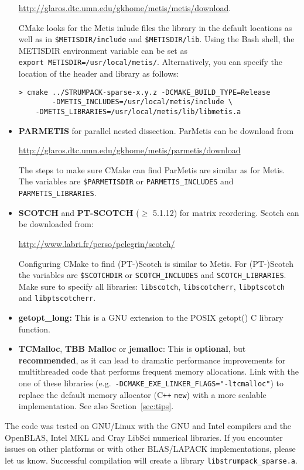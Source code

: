 \documentclass{article}
\newcommand{\tm}{\textsuperscript{\textregistered}}
\begin{document}
\begin{itemize}
  \url{http://glaros.dtc.umn.edu/gkhome/metis/metis/download}.

  CMake looks for the Metis inlude files the library in the default
  locations as well as in
  \lstinline[style=Bash]!$METISDIR/include!  and
  \lstinline[style=Bash]!$METISDIR/lib!. Using the Bash shell, the
  METISDIR environment variable can be set as\\
  \lstinline[style=Bash]!export METISDIR=/usr/local/metis/!.
  Alternatively, you can specify the
  location of the header and library as follows:
  \begin{lstlisting}[style=Bash]
    > cmake ../STRUMPACK-sparse-x.y.z -DCMAKE_BUILD_TYPE=Release
        -DMETIS_INCLUDES=/usr/local/metis/include \
	-DMETIS_LIBRARIES=/usr/local/metis/lib/libmetis.a
  \end{lstlisting}

\item \textbf{PARMETIS} for parallel nested dissection. ParMetis can
  be download from

  \url{http://glaros.dtc.umn.edu/gkhome/metis/parmetis/download}

  The steps to make sure CMake can find ParMetis are similar as for
  Metis. The variables are
  \lstinline[style=Bash]!$PARMETISDIR! or
  \lstinline[style=Bash]!PARMETIS_INCLUDES! and
  \lstinline[style=Bash]!PARMETIS_LIBRARIES!.

\item \textbf{SCOTCH} and \textbf{PT-SCOTCH} ($\geq$ 5.1.12) for
  matrix reordering. Scotch can be downloaded from:

  \url{http://www.labri.fr/perso/pelegrin/scotch/}

  Configuring CMake to find (PT-)Scotch is similar to Metis. For
  (PT-)Scotch the variables are
  \lstinline[style=Bash]!$SCOTCHDIR! or
  \lstinline[style=Bash]!SCOTCH_INCLUDES! and
  \lstinline[style=Bash]!SCOTCH_LIBRARIES!. Make sure to specify all
  libraries: \lstinline[style=Bash]!libscotch!,
  \lstinline[style=Bash]!libscotcherr!,
  \lstinline[style=Bash]!libptscotch! and
  \lstinline[style=Bash]!libptscotcherr!.

\item \textbf{getopt\_long:} This is a GNU extension to the POSIX
  getopt() C library function.
\item \textbf{TCMalloc}, \textbf{TBB Malloc} or \textbf{jemalloc}:
  This is \textbf{optional}, but \textbf{recommended}, as it can lead
  to dramatic performance improvements for multithreaded code that
  performs frequent memory allocations. Link with the one of these
  libraries
  (e.g.~\lstinline[style=Bash]!-DCMAKE_EXE_LINKER_FLAGS="-ltcmalloc"!)
  to replace the default memory allocator (C\texttt{++} \texttt{new})
  with a more scalable implementation. See also
  Section~\ref{sec:tips}.
\end{itemize}
The code was tested on GNU/Linux with the GNU and Intel\tm{} compilers
and the OpenBLAS, Intel\tm{} MKL\tm{} and Cray\tm{} LibSci\tm{}
numerical libraries. If you encounter issues on other platforms or
with other BLAS/LAPACK implementations, please let us know.
Successful compilation will create a library
\lstinline[style=Bash]{libstrumpack_sparse.a}.
\end{document}
